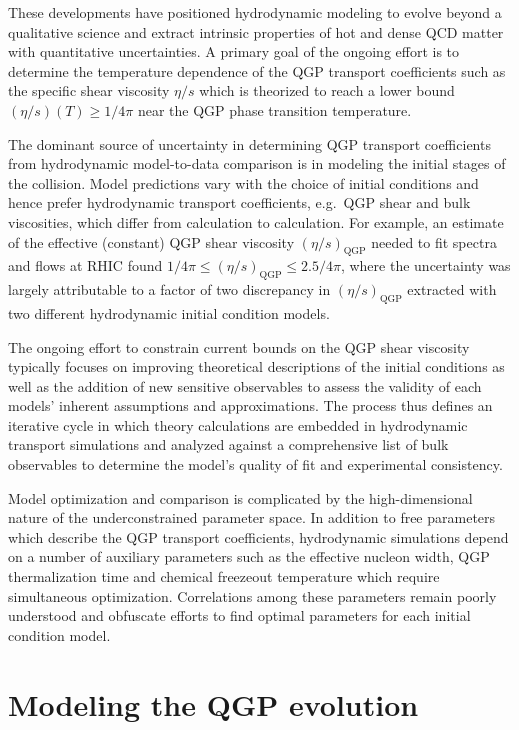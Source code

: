 \documentclass[aps,prc,reprint,amsmath]{revtex4-1}
\begin{document}
These developments have positioned hydrodynamic modeling to evolve beyond a qualitative science and extract intrinsic properties of hot and dense QCD matter with quantitative uncertainties. A primary goal of the ongoing effort is to determine the temperature dependence of the QGP transport coefficients such as the specific shear viscosity $\eta/s$ which is theorized to reach a lower bound ${(\eta/s)(T) \ge 1/4\pi}$ near the QGP phase transition temperature. 

The dominant source of uncertainty in determining QGP transport coefficients from hydrodynamic model-to-data comparison is in modeling the initial stages of the collision. Model predictions vary with the choice of initial conditions and hence prefer hydrodynamic transport coefficients, e.g.\ QGP shear and bulk viscosities, which differ from calculation to calculation. For example, an estimate of the effective (constant) QGP shear viscosity $(\eta/s)_\text{QGP}$ needed to fit spectra and flows at RHIC found ${1/4\pi \le (\eta/s)_\text{QGP} \le 2.5/4\pi}$, where the uncertainty was largely attributable to a factor of two discrepancy in $(\eta/s)_\text{QGP}$ extracted with two different hydrodynamic initial condition models. 

The ongoing effort to constrain current bounds on the QGP shear viscosity typically focuses on improving theoretical descriptions of the initial conditions as well as the addition of new sensitive observables to assess the validity of each models' inherent assumptions and approximations. The process thus defines an iterative cycle in which theory calculations are embedded in hydrodynamic transport simulations and analyzed against a comprehensive list of bulk observables to determine the model's quality of fit and experimental consistency.

Model optimization and comparison is complicated by the high-dimensional nature of the underconstrained parameter space. In addition to free parameters which describe the QGP transport coefficients, hydrodynamic simulations depend on a number of auxiliary parameters such as the effective nucleon width, QGP thermalization time and chemical freezeout temperature which require simultaneous optimization. Correlations among these parameters remain poorly understood and obfuscate efforts to find optimal parameters for each initial condition model.




\section{Modeling the QGP evolution}
\end{document}
